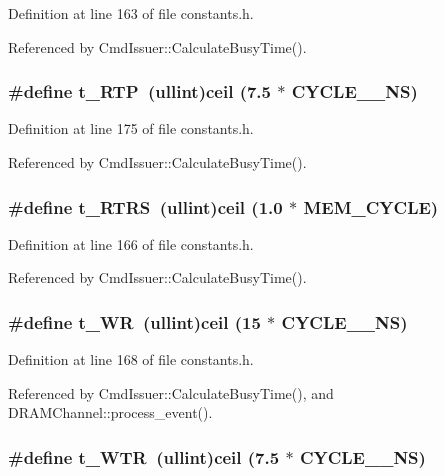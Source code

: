 Definition at line 163 of file constants.h.

Referenced by CmdIssuer::CalculateBusyTime().
\subsubsection[{t\_\-RTP}]{\setlength{\rightskip}{0pt plus 5cm}\#define t\_\-RTP~({\bf ullint})ceil (7.5 $\ast$ CYCLE\_\_\-NS)}\label{constants_8h_6a8aab4cde7a1bbf20a4847d91b98d68}




Definition at line 175 of file constants.h.

Referenced by CmdIssuer::CalculateBusyTime().
\subsubsection[{t\_\-RTRS}]{\setlength{\rightskip}{0pt plus 5cm}\#define t\_\-RTRS~({\bf ullint})ceil (1.0 $\ast$ MEM\_\-CYCLE)}\label{constants_8h_1dea73a184a0cdad796580ae336a80af}




Definition at line 166 of file constants.h.

Referenced by CmdIssuer::CalculateBusyTime().
\subsubsection[{t\_\-WR}]{\setlength{\rightskip}{0pt plus 5cm}\#define t\_\-WR~({\bf ullint})ceil (15 $\ast$ CYCLE\_\_\-NS)}\label{constants_8h_7437ca1e4f03ea9a7a1582aa7e214366}




Definition at line 168 of file constants.h.

Referenced by CmdIssuer::CalculateBusyTime(), and DRAMChannel::process\_\-event().
\subsubsection[{t\_\-WTR}]{\setlength{\rightskip}{0pt plus 5cm}\#define t\_\-WTR~({\bf ullint})ceil (7.5 $\ast$ CYCLE\_\_\-NS)}\label{constants_8h_4744fcfb7a1ce70653926d5a319fded9}




